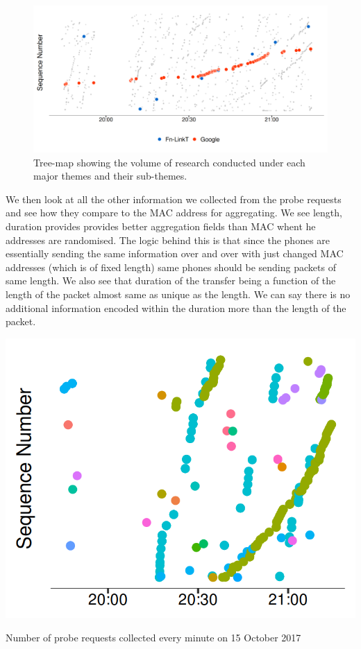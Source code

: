 \begin{figure}
  \includegraphics{images/home-sequence-time.png}
  \caption{Tree-map showing the volume of research conducted under each major themes and their sub-themes.}
  \label{figure:collection:home:sequence}
\end{figure}

We then look at all the other information we collected from the probe requests and see how they compare to the MAC address for aggregating.
We see length, duration provides provides better aggregation fields than MAC whent he addresses are randomised.
The logic behind this is that since the phones are essentially sending the same information over and over with just changed MAC addresses (which is of fixed length) same phones should be sending packets of same length.
We also see that duration of the transfer being a function of the length of the packet almost same as unique as the length.
We can say there is no additional information encoded within the duration more than the length of the packet.

\begin{marginfigure}
  \forcerectofloat
  \includegraphics{images/home-samsung-google.png}
  \caption{Number of probe requests collected every minute on 15 October 2017}
  \label{figure:collection:home:samsung}
\end{marginfigure}

